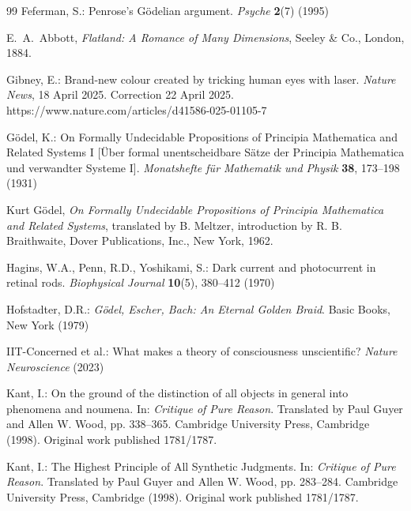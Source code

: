 \documentclass[runningheads]{llncs}
\begin{document}
\begin{thebibliography}{99}
Feferman, S.: Penrose's Gödelian argument. \textit{Psyche} \textbf{2}(7) (1995)

E.~A.~Abbott, \textit{Flatland: A Romance of Many Dimensions}, Seeley \& Co., London, 1884.

Gibney, E.: Brand-new colour created by tricking human eyes with laser. \textit{Nature News}, 18 April 2025. Correction 22 April 2025. https://www.nature.com/articles/d41586-025-01105-7

Gödel, K.: On Formally Undecidable Propositions of Principia Mathematica and Related Systems I [Über formal unentscheidbare Sätze der Principia Mathematica und verwandter Systeme I]. \textit{Monatshefte für Mathematik und Physik} \textbf{38}, 173--198 (1931)

Kurt Gödel, \textit{On Formally Undecidable Propositions of \emph{Principia Mathematica} and Related Systems}, 
translated by B. Meltzer, introduction by R. B. Braithwaite, Dover Publications, Inc., New York, 1962.

Hagins, W.A., Penn, R.D., Yoshikami, S.: Dark current and photocurrent in retinal rods. \textit{Biophysical Journal} \textbf{10}(5), 380--412 (1970)

Hofstadter, D.R.: \textit{Gödel, Escher, Bach: An Eternal Golden Braid}. Basic Books, New York (1979)


IIT-Concerned et al.: What makes a theory of consciousness unscientific? \textit{Nature Neuroscience} (2023)

Kant, I.: On the ground of the distinction of all objects in general into phenomena and noumena. In: \textit{Critique of Pure Reason}. Translated by Paul Guyer and Allen W. Wood, pp. 338--365. Cambridge University Press, Cambridge (1998). Original work published 1781/1787.

Kant, I.: The Highest Principle of All Synthetic Judgments. In: \textit{Critique of Pure Reason}. Translated by Paul Guyer and Allen W. Wood, pp. 283--284. Cambridge University Press, Cambridge (1998). Original work published 1781/1787.


\end{thebibliography}
\end{document}

